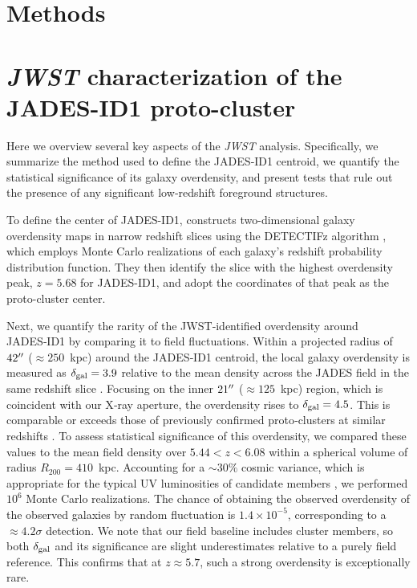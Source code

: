 \documentclass[pdflatex,sn-mathphys-num]{sn-jnl}
\newcommand{\arcsec}{\mbox{\ensuremath{^{\prime\prime}}}}
\theoremstyle{thmstyleone}
\theoremstyle{thmstyletwo}
\theoremstyle{thmstylethree}
\begin{document}
\newpage

\section*{Methods}

\section{\textit{JWST} characterization of the JADES-ID1 proto-cluster}
\label{sec:jwst}

Here we overview several key aspects of the \textit{JWST} analysis.  Specifically, we summarize the method used to define the JADES‑ID1 centroid, we quantify the statistical significance of its galaxy overdensity, and present tests that rule out the presence of any significant low‑redshift foreground structures.

To define the center of JADES-ID1, \cite{2025MNRAS.539.1796L} constructs two-dimensional galaxy overdensity maps in narrow redshift slices using the DETECTIFz algorithm \cite{2021MNRAS.506.2136S}, which employs Monte Carlo realizations of each galaxy's redshift probability distribution function. They then identify the slice with the highest overdensity peak, $z =5.68$ for JADES-ID1, and adopt the coordinates of that peak as the proto-cluster center.

Next, we quantify the rarity of the JWST‑identified overdensity around JADES‑ID1 by comparing it to field fluctuations.  Within a projected radius of $42\arcsec$ ($\approx250$~kpc) around the JADES‑ID1 centroid, the local galaxy overdensity is measured as $\delta_{\rm gal}=3.9$ relative to the mean density across the JADES field in the same redshift slice \cite{2025MNRAS.539.1796L}.  Focusing on the inner $21\arcsec$ ($\approx125$~kpc) region, which is coincident with our X‑ray aperture, the overdensity rises to $\delta_{\rm gal}=4.5$. This is comparable or exceeds those of previously confirmed proto‑clusters at similar redshifts \cite{2024ApJ...974...41H}. To assess statistical significance of this overdensity, we compared these values to the mean field density over $5.44<z<6.08$ within a spherical volume of radius $R_{200}=410$~kpc.  Accounting for a $\sim30\%$ cosmic variance, which is appropriate for the typical UV luminosities of candidate members \cite{2020MNRAS.499.2401T,2025MNRAS.539.1796L}, we performed $10^6$ Monte Carlo realizations.  The chance of obtaining the observed overdensity of the observed galaxies by random fluctuation is $1.4\times10^{-5}$, corresponding to a $\approx4.2\sigma$ detection.  We note that our field baseline includes cluster members, so both $\delta_{\rm gal}$ and its significance are slight underestimates relative to a purely field reference. This confirms that at $z\approx5.7$, such a strong overdensity is exceptionally rare.
\end{document}
